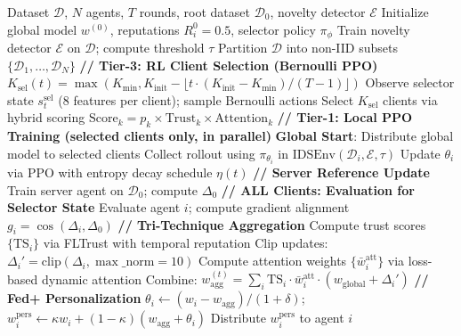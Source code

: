\documentclass[conference]{IEEEtran}
\begin{document}
\begin{algorithm}[t]
\caption{FedRL-IDS Training Procedure}
\label{alg:fedrlids}
\begin{algorithmic}[1]
\REQUIRE Dataset $\mathcal{D}$, $N$ agents, $T$ rounds, root dataset $\mathcal{D}_0$, novelty detector $\mathcal{E}$
\STATE Initialize global model $w^{(0)}$, reputations $R_i^0 = 0.5$, selector policy $\pi_{\phi}$
\STATE Train novelty detector $\mathcal{E}$ on $\mathcal{D}$; compute threshold $\tau$
\STATE Partition $\mathcal{D}$ into non-IID subsets $\{\mathcal{D}_1, \ldots, \mathcal{D}_N\}$
    \STATE \textbf{// Tier-3: RL Client Selection (Bernoulli PPO)}
    \STATE $K_{\mathrm{sel}}(t) = \max(K_{\min}, K_{\mathrm{init}} - \lfloor t \cdot (K_{\mathrm{init}}-K_{\min})/(T-1) \rfloor)$
    \STATE Observe selector state $s_t^{\mathrm{sel}}$ (8 features per client); sample Bernoulli actions
    \STATE Select $K_{\mathrm{sel}}$ clients via hybrid scoring $\mathrm{Score}_k = p_k \times \mathrm{Trust}_k \times \mathrm{Attention}_k$
    \STATE \textbf{// Tier-1: Local PPO Training (selected clients only, in parallel)}
    \STATE \textbf{Global Start}: Distribute global model to selected clients
            \STATE Collect rollout using $\pi_{\theta_i}$ in $\mathrm{IDSEnv}(\mathcal{D}_i, \mathcal{E}, \tau)$
        \ENDFOR
        \STATE Update $\theta_i$ via PPO with entropy decay schedule $\eta(t)$
    \ENDFOR
    \STATE \textbf{// Server Reference Update}
    \STATE Train server agent on $\mathcal{D}_0$; compute $\Delta_0$
    \STATE \textbf{// ALL Clients: Evaluation for Selector State}
        \STATE Evaluate agent $i$; compute gradient alignment $g_i = \cos(\Delta_i, \Delta_0)$
    \ENDFOR
    \STATE \textbf{// Tri-Technique Aggregation}
    \STATE Compute trust scores $\{\mathrm{TS}_i\}$ via FLTrust with temporal reputation
    \STATE Clip updates: $\Delta_i' = \mathrm{clip}(\Delta_i, \max\_\mathrm{norm}=10)$
    \STATE Compute attention weights $\{\bar{w}_i^{\mathrm{att}}\}$ via loss-based dynamic attention
    \STATE Combine: $w_{\mathrm{agg}}^{(t)} = \sum_i \mathrm{TS}_i \cdot \bar{w}_i^{\mathrm{att}} \cdot (w_{\mathrm{global}} + \Delta_i')$
    \STATE \textbf{// Fed+ Personalization}
        \STATE $\theta_i \leftarrow (w_i - w_{\mathrm{agg}})/(1+\delta)$; $w_i^{\mathrm{pers}} \leftarrow \kappa w_i + (1-\kappa)(w_{\mathrm{agg}} + \theta_i)$
        \STATE Distribute $w_i^{\mathrm{pers}}$ to agent $i$

\end{algorithmic}
\end{algorithm}
\end{document}
